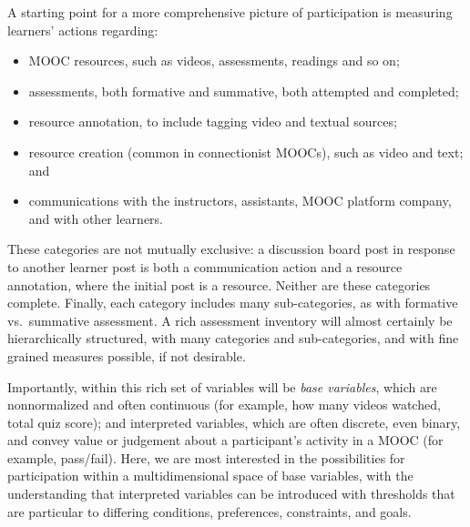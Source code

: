 A starting point for a more comprehensive picture of
participation is measuring learners' actions regarding: 

\begin{itemize}

\item MOOC resources,
such as videos, assessments, readings and so on;

\item assessments, both
formative and summative, both attempted and completed; 

\item resource
annotation, to include tagging video and textual sources; 

\item resource
creation (common in connectionist MOOCs), such as video and text; and

\item communications with the instructors, assistants, MOOC platform company,
and with other learners.

\end{itemize}


These categories are not mutually exclusive:  a discussion board
post in response to another learner post is both a communication action
and a resource annotation, where the initial post
is a resource.  Neither are these categories
complete. Finally, each category includes many
sub-categories, as with  formative vs.\ summative
assessment. A rich assessment inventory will almost certainly be
hierarchically structured, with many categories and sub-categories, and
with fine grained measures possible, if not desirable.

Importantly, within this rich set of variables will be \emph{base variables},
which are nonnormalized and often continuous (for example, how many videos
watched, total quiz score); and interpreted variables, which are often
discrete, even binary, and convey value or judgement about a
participant's activity in a MOOC (for example, pass/fail). Here, we
are most interested in the possibilities for participation within a
multidimensional space of base variables, with the understanding that
interpreted variables can be introduced with thresholds that are
particular to differing conditions, preferences, constraints, and goals.

